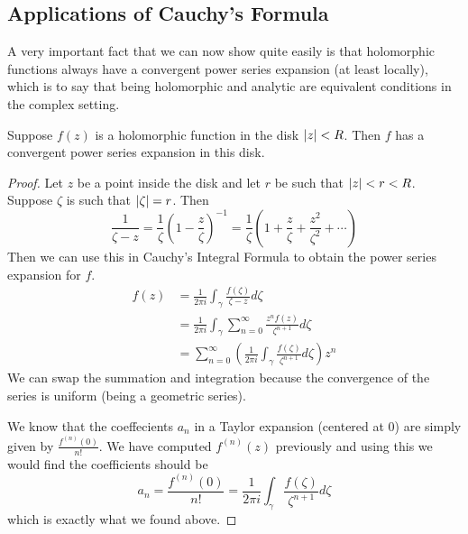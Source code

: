\subsection{Applications of Cauchy's Formula}
A very important fact that we can now show quite easily is that holomorphic functions always have a convergent power series expansion (at least locally), which is to say that being holomorphic and analytic are equivalent conditions in the complex setting.
\begin{theorem}
Suppose $f(z)$ is a holomorphic function in the disk $\left|z\right| < R$. Then $f$ has a convergent power series expansion in this disk.
\end{theorem}
\begin{proof}
    Let $z$ be a point inside the disk and let $r$ be such that $\left|z\right| < r < R$. Suppose $\zeta$ is such that $\left|\zeta\right| = r$. Then
    $$ \frac{1}{\zeta - z} = \frac{1}{\zeta} \left(1 - \frac{z}{\zeta} \right)^{-1} = \frac{1}{\zeta} \left( 1 + \frac{z}{\zeta} + \frac{z^2}{\zeta^2} + \cdots \right) $$
    Then we can use this in Cauchy's Integral Formula to obtain the power series expansion for $f$.
    \begin{align*}
        f(z) &= \frac{1}{2\pi i} \int_{\gamma} \frac{f(\zeta)}{\zeta - z} d\zeta\\
        &= \frac{1}{2\pi i} \int_\gamma \sum_{n = 0}^\infty \frac{z^n f(z)}{\zeta^{n + 1}} d\zeta\\
        &= \sum_{n = 0}^\infty \left( \frac{1}{2\pi i} \int_\gamma \frac{f(\zeta)}{\zeta^{n + 1}} d\zeta \right) z^n
    \end{align*}
    We can swap the summation and integration because the convergence of the series is uniform (being a geometric series). 
    
    We know that the coeffecients $a_n$ in a Taylor expansion (centered at 0) are simply given by $\frac{f^{(n)}(0)}{n!}$. We have computed $f^{(n)}(z)$ previously and using this we would find the coefficients should be
    $$ a_n = \frac{f^{(n)}(0)}{n!} = \frac{1}{2\pi i} \int_\gamma \frac{f(\zeta)}{\zeta^{n + 1}} d\zeta $$
    which is exactly what we found above.
\end{proof}

